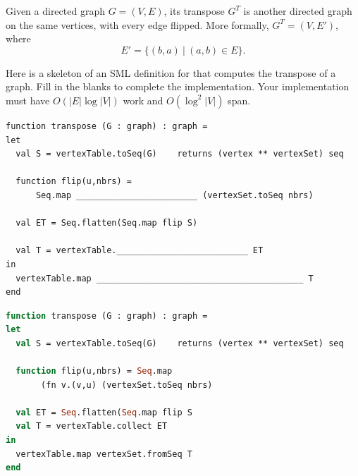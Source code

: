 \begin{problem}[10.]
Given a directed graph $G = (V,E)$, its transpose $G^T$ is
another directed graph on the same vertices, with every edge flipped.
More formally, $G^T = (V,E')$, where
$$E' = \{(b,a)~|~(a,b) \in E \}.$$

Here is a skeleton of an SML definition for  that computes
the transpose of a graph. Fill in the blanks to complete the implementation.
Your implementation must have $O(|E| \log |V|)$ work and $O(\log^2 |V|)$
span.

\ask
\begin{lstlisting}[numbers=none]
function transpose (G : graph) : graph = 
let
  val S = vertexTable.toSeq(G)    returns (vertex ** vertexSet) seq 

  function flip(u,nbrs) = 
      Seq.map ________________________ (vertexSet.toSeq nbrs)

  val ET = Seq.flatten(Seq.map flip S)

  val T = vertexTable.__________________________ ET
in
  vertexTable.map _________________________________________ T
end
\end{lstlisting} 

\sol

\begin{lstlisting}[language=ocaml,numbers=none]
function transpose (G : graph) : graph = 
let
  val S = vertexTable.toSeq(G)    returns (vertex ** vertexSet) seq 

  function flip(u,nbrs) = Seq.map 
       (fn v.(v,u) (vertexSet.toSeq nbrs)

  val ET = Seq.flatten(Seq.map flip S
  val T = vertexTable.collect ET
in
  vertexTable.map vertexSet.fromSeq T
end
\end{lstlisting} 
\end{problem}


